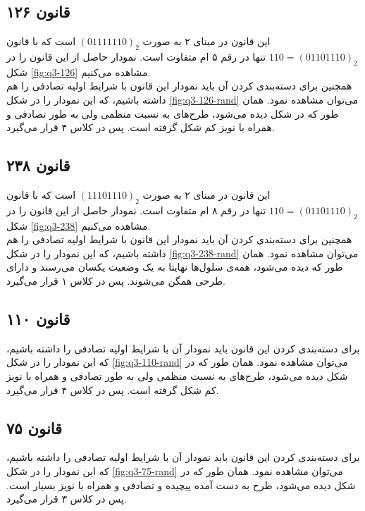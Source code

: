 \documentclass[11pt, a4paper]{article}
\begin{document}
\subsection{قانون ۱۲۶}
این قانون در مبنای ۲ به صورت $(01111110)_2$ است که با قانون $110=(01101110)_2$ تنها در رقم ۵ ام متفاوت است. نمودار حاصل از این قانون را در شکل \ref{fig:q3-126} مشاهده می‌کنیم.\\
همچنین برای دسته‌بندی کردن آن باید نمودار این قانون با شرایط اولیه تصادفی را هم داشته باشیم، که این نمودار را در شکل \ref{fig:q3-126-rand} می‌توان مشاهده نمود. همان طور که در شکل دیده می‌شود، طرح‌های به نسبت منظمی ولی به طور تصادفی و همراه با نویز کم شکل گرفته است. پس در کلاس ۴ قرار می‌گیرد.

\subsection{قانون ۲۳۸}
این قانون در مبنای ۲ به صورت $(11101110)_2$ است که با قانون $110=(01101110)_2$ تنها در رقم ۸ ام متفاوت است. نمودار حاصل از این قانون را در شکل \ref{fig:q3-238} مشاهده می‌کنیم.\\
همچنین برای دسته‌بندی کردن آن باید نمودار این قانون با شرایط اولیه تصادفی را هم داشته باشیم، که این نمودار را در شکل \ref{fig:q3-238-rand} می‌توان مشاهده نمود. همان طور که دیده می‌شود، همه‌ی سلول‌ها نهایتا به یک وضعیت یکسان می‌رسند و دارای طرحی همگن می‌شوند. پس در کلاس ۱ قرار می‌گیرد.

\subsection{قانون ۱۱۰}
برای دسته‌بندی کردن این قانون باید نمودار آن با شرایط اولیه تصادفی را داشته باشیم، که این نمودار را در شکل \ref{fig:q3-110-rand} می‌توان مشاهده نمود. همان طور که در شکل دیده می‌شود، طرح‌های به نسبت منظمی ولی به طور تصادفی و همراه با نویز کم شکل گرفته است. پس در کلاس ۴ قرار می‌گیرد.

\subsection{قانون ۷۵}
برای دسته‌بندی کردن این قانون باید نمودار آن با شرایط اولیه تصادفی را داشته باشیم، که این نمودار را در شکل \ref{fig:q3-75-rand} می‌توان مشاهده نمود. همان طور که در شکل دیده می‌شود، طرح به دست آمده پیچیده و تصادفی و همراه با نویز بسیار است. پس در کلاس ۳ قرار می‌گیرد.
\end{document}
